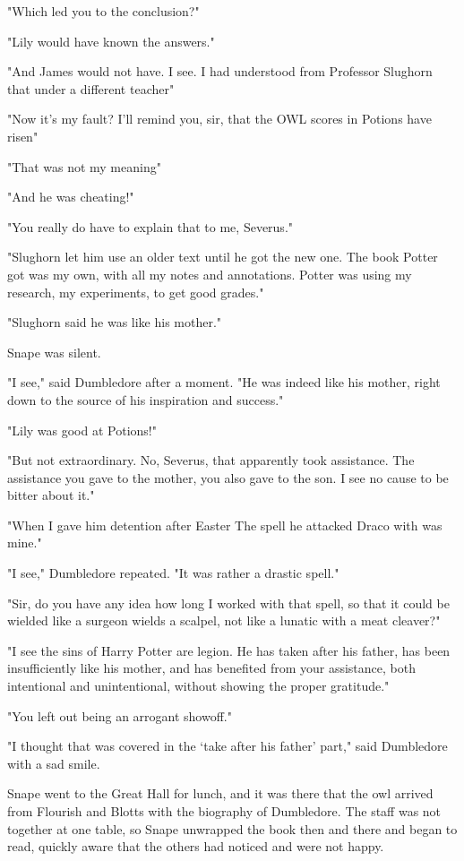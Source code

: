 "Which led you to the conclusion{\el}?"

"Lily would have known the answers."

"And James would not have. I see. I had understood from Professor Slughorn that under a different teacher{\el}"

"Now it's my fault? I'll remind you, sir, that the OWL scores in Potions have risen{\el}"

"That was not my meaning{\el}"

"And he was cheating!"

"You really do have to explain that to me, Severus."

"Slughorn let him use an older text until he got the new one. The book Potter got was my own, with all my notes and annotations. Potter was using my research, my experiments, to get good grades."

"Slughorn said he was like his mother."

Snape was silent.

"I see," said Dumbledore after a moment. "He was indeed like his mother, right down to the source of his inspiration and success."

"Lily was good at Potions!"

"But not extraordinary. No, Severus, that apparently took assistance. The assistance you gave to the mother, you also gave to the son. I see no cause to be bitter about it."

"When I gave him detention after Easter{\el} The spell he attacked Draco with was mine."

"I see," Dumbledore repeated. "It was rather a{\el} drastic spell."

"Sir, do you have any idea how long I worked with that spell, so that it could be wielded like a surgeon wields a scalpel, not like a lunatic with a meat cleaver?"

"I see the sins of Harry Potter are legion. He has taken after his father, has been insufficiently like his mother, and has benefited from your assistance, both intentional and unintentional, without showing the proper gratitude."

"You left out being an arrogant showoff."

"I thought that was covered in the `take after his father' part," said Dumbledore with a sad smile.

Snape went to the Great Hall for lunch, and it was there that the owl arrived from Flourish and Blotts with the biography of Dumbledore. The staff was not together at one table, so Snape unwrapped the book then and there and began to read, quickly aware that the others had noticed and were{\el} not happy.

